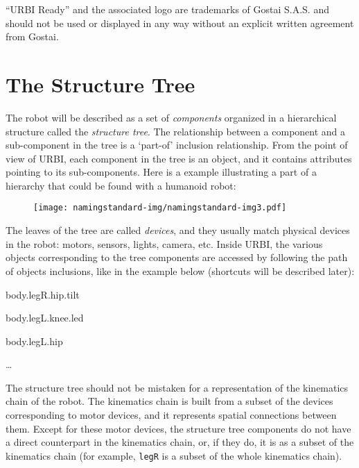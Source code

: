 \documentclass[a4paper]{article}
\begin{document}
{
“URBI Ready” and the associated logo are trademarks of Gostai S.A.S. and
should not be used or displayed in any way without an explicit written
agreement from Gostai.}

\section[The Structure Tree]{ The Structure
Tree}
{
\textsf{The robot will be described as a set of
}\textsf{\textit{components}}\textsf{ organized in a hierarchical
structure called the }\textsf{\textit{structure tree}}\textsf{. The
relationship between a component and a sub-component in the tree is a
‘part-of’ inclusion relationship. From the point of view of URBI, each
component in the tree is an object, and it contains attributes pointing
to its sub-components. Here is a example illustrating a part of a
hierarchy that could be found with a humanoid robot:}}



\begin{figure}
\centering
\texttt{[image: namingstandard-img/namingstandard-img3.pdf]}
\end{figure}
{
\textsf{The leaves of the tree are called
}\textsf{\textit{devices}}\textsf{, and they usually match physical
devices in the robot: motors, sensors, lights, camera, etc. Inside
URBI, the various objects corresponding to the tree components are
accessed by following the path of objects inclusions, like in the
example below (shortcuts will be described later):}}

{
body.legR.hip.tilt}

{
body.legL.knee.led}

{
body.legL.hip}

{
…}

{\sffamily
The structure tree should not be mistaken for a representation of the
kinematics chain of the robot. The kinematics chain is built from a
subset of the devices corresponding to motor devices, and it represents
spatial connections between them. Except for these motor devices, the
structure tree components do not have a direct counterpart in the
kinematics chain, or, if they do, it is as a subset of the kinematics
chain (for example, \texttt{legR} is a subset of the whole kinematics
chain).}
\end{document}
